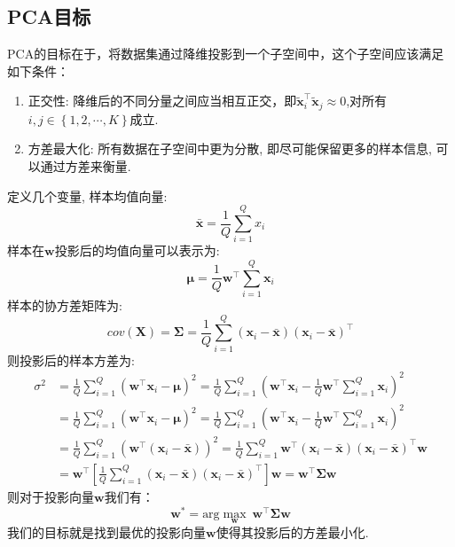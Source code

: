 \documentclass[lang=cn,10pt]{gorgeousnbook}
\numberwithin{equation}{section}%
\numberwithin{figure}{section}%
\begin{document}
\subsection{ PCA目标}
PCA的目标在于，将数据集通过降维投影到一个子空间中，这个子空间应该满足如下条件：
 \begin{enumerate} 
 \item 正交性: 降维后的不同分量之间应当相互正交，即$\mathbf{\tilde{x}}_{i}^{\top}\mathbf{\tilde{x}}_j\approx 0$,对所有$i,j\in \left\{ 1,2,\cdots ,K \right\} $成立.
  \item 方差最大化: 所有数据在子空间中更为分散, 即尽可能保留更多的样本信息, 可以通过方差来衡量. 
  \end{enumerate}
定义几个变量, 样本均值向量: 
\begin{equation}
\mathbf{\bar{x}}=\frac{1}{Q}\sum_{i=1}^Q{x_i}
\end{equation}
样本在$\mathbf{w}$投影后的均值向量可以表示为: 
\begin{equation}
\boldsymbol{\mu } =\frac{1}{Q}\mathbf{w}^{\top}\sum_{i=1}^Q{\mathbf{x}_i}
\end{equation}
样本的协方差矩阵为:
\begin{equation}
cov\left( \mathbf{X} \right) =\mathbf{\Sigma }=\frac{1}{Q}\sum_{i=1}^Q{\left( \mathbf{x}_i-\mathbf{\bar{x}} \right)}\left( \mathbf{x}_i-\mathbf{\bar{x}} \right) ^{\top}
\end{equation}
则投影后的样本方差为:
\begin{equation}
\begin{aligned}
\sigma ^2&=\frac{1}{Q}\sum_{i=1}^Q{\left( \mathbf{w}^{\top}\mathbf{x}_i-\boldsymbol{\mu } \right) ^2} =\frac{1}{Q}\sum_{i=1}^Q{\left( \mathbf{w}^{\top}\mathbf{x}_i-\frac{1}{Q}\mathbf{w}^{\top}\sum_{i=1}^Q{\mathbf{x}_i} \right) ^2} \\
&=\frac{1}{Q}\sum_{i=1}^Q{\left( \mathbf{w}^{\top}\mathbf{x}_i-\boldsymbol{\mu } \right) ^2} 
=\frac{1}{Q}\sum_{i=1}^Q{\left( \mathbf{w}^{\top}\mathbf{x}_i-\frac{1}{Q}\mathbf{w}^{\top}\sum_{i=1}^Q{\mathbf{x}_i} \right) ^2}\\
&=\frac{1}{Q}\sum_{i=1}^Q{\left( \mathbf{w}^{\top}\left( \mathbf{x}_i-\mathbf{\bar{x}} \right) \right) ^2}=\frac{1}{Q}\sum_{i=1}^Q{\mathbf{w}^{\top}\left( \mathbf{x}_i-\mathbf{\bar{x}} \right) \left( \mathbf{x}_i-\mathbf{\bar{x}} \right) ^{\top}\mathbf{w}} \\
&=\mathbf{w}^{\top}\left[ \frac{1}{Q}\sum_{i=1}^Q{\left( \mathbf{x}_i-\mathbf{\bar{x}} \right) \left( \mathbf{x}_i-\mathbf{\bar{x}} \right) ^{\top}} \right] \mathbf{w}=\mathbf{w}^{\top}\mathbf{\Sigma w}
\end{aligned}
\end{equation}
则对于投影向量$\mathbf{w}$我们有：
\begin{equation}
\mathbf{w^*}=\text{arg}\underset{\mathbf{w}}{\max}\ \mathbf{w}^{\top}\mathbf{\Sigma w}
\end{equation}
我们的目标就是找到最优的投影向量$\mathbf{w}$使得其投影后的方差最小化.
\end{document}
